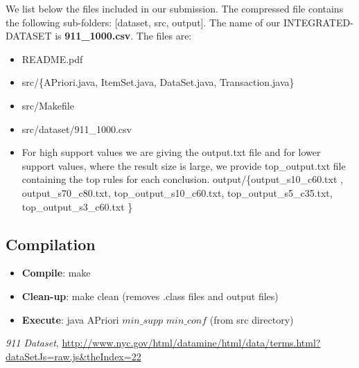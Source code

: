 \documentclass[11pt]{article}
\begin{document}
We list below the files included in our submission. The compressed file contains the following sub-folders: [dataset, src, output].
The name of our INTEGRATED-DATASET  is \textbf{911\_1000.csv}.
The files are:
\begin{itemize}
\item README.pdf
\item src/\{APriori.java, ItemSet.java, DataSet.java, Transaction.java\}
\item src/Makefile
\item src/dataset/911\_1000.csv
\item  For high support values we are giving the output.txt file and for lower support values, where the result size is large, we provide top\_output.txt file containing the 
top rules for each conclusion.
output/\{output\_s10\_c60.txt , output\_s70\_c80.txt,  top\_output\_s10\_c60.txt,  top\_output\_s5\_c35.txt,  top\_output\_s3\_c60.txt \}
\end{itemize}

\subsection* {Compilation}
\begin{itemize}
\item \textbf{Compile}: make
\item \textbf{Clean-up}: make clean (removes .class files and output files)
\item\textbf{Execute}: java APriori  $min\_supp$ $min\_conf$ (from src directory)

\end{itemize}


\begin{thebibliography}{50}
 \textit{911 Dataset}, \url{http://www.nyc.gov/html/datamine/html/data/terms.html?dataSetJs=raw.js&theIndex=22}
\end{thebibliography}
\end{document}
